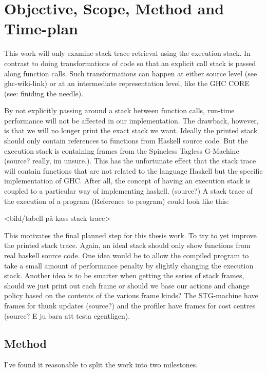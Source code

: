 \chapter{Objective, Scope, Method and Time-plan}

This work will only examine stack trace retrieval using the execution stack. In
contrast to doing transformations of code so that an explicit call stack is
passed along function calls. Such transformations  can happen at either source
level (see ghc-wiki-link) or at an intermediate representation level, like the GHC
CORE (see: finiding the needle).

By not explicitly passing around a stack between function calls, run-time
performance will not be affected in our implementation. The drawback, however,
is that we will no longer print the exact stack we want. Ideally the printed
stack should only contain references to functions from Haskell source code. But
the execution stack is containing frames from the Spineless Tagless G-Machine
(source? really, im unsure.).  This has the unfortunate effect that the stack
trace will contain functions that are not related to the language Haskell but
the specific implementation of GHC. After all, the concept of having an
execution stack is coupled to a particular way of implementing haskell.
(source?)  A stack trace of the execution of a program (Reference to program)
could look like this:

<bild/tabell på kass stack trace>

This motivates the final planned step for this thesis work. To try to yet
improve the printed stack trace. Again, an ideal stack should only show
functions from real haskell source code.  One idea would be to allow the
compiled program to take a small amount of performance penalty by slightly
changing the execution stack. Another idea is to be smarter when getting the
series of stack frames, should we just print out each frame or should we base
our actions and change policy based on the contents of the various frame kinds?
The STG-machine have frames for thunk updates (source?) and the profiler have
frames for cost centres (source? E ju bara att testa egentligen).

\section{Method}

I've found it reasonable to split the work into two milestones.

